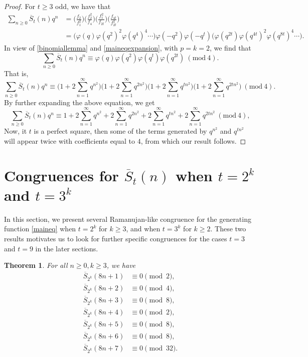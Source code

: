\documentclass[12pt]{amsart}
\newcommand{\sst}{\overline{S}}
\theoremstyle{plain}
\newtheorem{theorem}{Theorem}[section]
\theoremstyle{definition}
\begin{document}
\begin{proof} For $t \geq 3$ odd, we have that
\begin{align}
\sum_{n\geq 0} \overline{S}_{t}(n) q^{n} &= \bigg( \frac{f_{2}}{f_{1}^{2}} \bigg) \bigg( \frac{f_{2}^{2}}{f_{4}} \bigg) \bigg( \frac{f_{t}^{2}}{f_{2t}} \bigg) \bigg( \frac{f_{4t}}{f_{2t}^{2}} \bigg)\\
&= \bigg( \varphi(q) \varphi(q^2)^2 \varphi(q^4)^4 \cdots \bigg) \varphi(-q^2) \varphi(-q^t) \bigg( \varphi(q^{2t}) \varphi(q^{4t})^2 \varphi(q^{8t})^4 \cdots \bigg). \label{maineqexpansion}
\end{align}
In view of \eqref{binomiallemma} and \eqref{maineqexpansion}, with $p=k=2$, we find that
\[
\sum_{n\geq 0} \overline{S}_{t}(n) q^{n} \equiv \varphi(q) \varphi(q^{2}) \varphi(q^{t}) \varphi(q^{2t}) \ (\mathrm{mod} \ 4) .
\]
That is,
\[
\sum_{n\geq 0} \overline{S}_{t}(n) q^{n} \equiv  \bigg( 1+2\sum_{n=1}^{\infty} q^{n^{2}} \bigg) \bigg( 1+2\sum_{n=1}^{\infty} q^{2n^{2}} \bigg) \bigg( 1+2\sum_{n=1}^{\infty} q^{tn^{2}} \bigg) \bigg( 1+2\sum_{n=1}^{\infty} q^{2tn^{2}} \bigg) \ (\mathrm{mod} \ 4) .
\]
By further expanding the above equation, we get
\[
\sum_{n\geq 0} \overline{S}_{t}(n) q^{n} \equiv  1+ 2\sum_{n=1}^{\infty} q^{n^{2}} +2\sum_{n=1}^{\infty} q^{2n^{2}} + 2\sum_{n=1}^{\infty} q^{tn^{2}}+2\sum_{n=1}^{\infty} q^{2tn^{2}}  \ (\mathrm{mod} \ 4) ,
\]
Now, it $t$ is a perfect square, then some of the terms generated by $q^{n^{2}}$ and $q^{tn^{2}}$ will appear twice with coefficients equal to $4$, from which our result follows.
\end{proof}





\section{Congruences for $\overline{S}_{t}(n)$ when $t=2^k$ and $t=3^k$} \label{sec4}
In this section, we present several Ramanujan-like congruence for the generating function \eqref{maineq} when $t=2^k$ for $k\geq 3$, and when $t=3^k$ for $k\geq 2$. These two results motivates us to look for further specific congruences for the cases $t=3$ and $t=9$ in the later sections.

\begin{theorem}
    For all $n\geq 0, k\geq 3$, we have
    \begin{align*}
        \sst_{2^k}(8n+1)&\equiv 0\pmod{2},\\
    \sst_{2^k}(8n+2)&\equiv 0\pmod{4},\\
    \sst_{2^k}(8n+3)&\equiv 0\pmod{8},\\
    \sst_{2^k}(8n+4)&\equiv 0\pmod{2},\\
    \sst_{2^k}(8n+5)&\equiv 0\pmod{8},\\
    \sst_{2^k}(8n+6)&\equiv 0\pmod{8},\\
    \sst_{2^k}(8n+7)&\equiv 0\pmod{32}.
    \end{align*}
\end{theorem}
\end{document}
